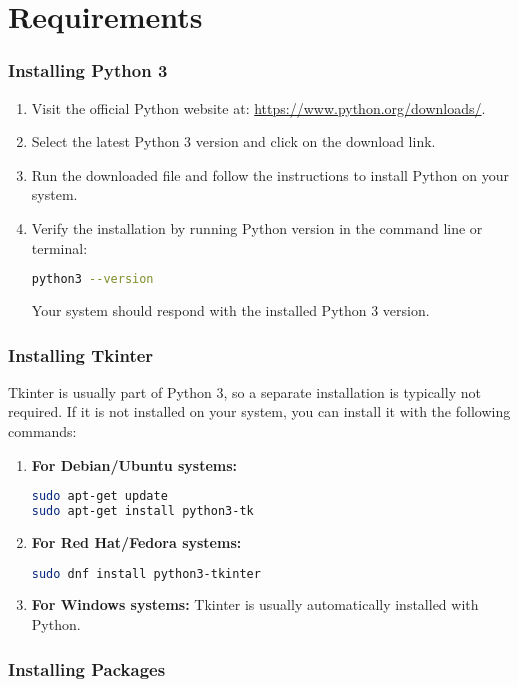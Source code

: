 \section{Requirements}
\subsubsection*{Installing Python 3}
\begin{enumerate}
\item Visit the official Python website at: \url{https://www.python.org/downloads/}.
\item Select the latest Python 3 version and click on the download link.
\item Run the downloaded file and follow the instructions to install Python on your system.
\item Verify the installation by running Python version in the command line or terminal:
\begin{lstlisting}[language=bash]
python3 --version
\end{lstlisting}
Your system should respond with the installed Python 3 version.
\end{enumerate}

\clearpage
\subsubsection*{Installing Tkinter}
Tkinter is usually part of Python 3, so a separate installation is typically not required. If it is not installed on your system, you can install it with the following commands:
\begin{enumerate}
\item \textbf{For Debian/Ubuntu systems:}
\begin{lstlisting}[language=bash]
sudo apt-get update
sudo apt-get install python3-tk
\end{lstlisting}
\item \textbf{For Red Hat/Fedora systems:}
\begin{lstlisting}[language=bash]
sudo dnf install python3-tkinter
\end{lstlisting}
\item \textbf{For Windows systems:}
Tkinter is usually automatically installed with Python.
\end{enumerate}

\subsubsection*{Installing Packages}
